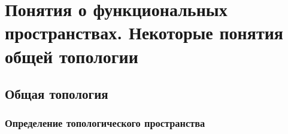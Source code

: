 \chapter{Понятия о функциональных пространствах.
 Некоторые понятия общей топологии}
\section{Общая топология}
\subsection{Определение топологического пространства}
